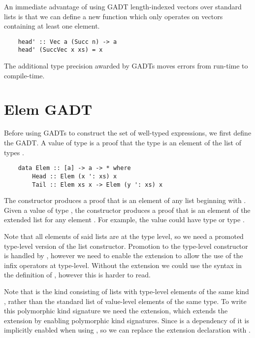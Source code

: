 An immediate advantage of using GADT length-indexed vectors over standard lists is that we can define a new function  which only operates on vectors containing at least one element. 

\begin{lstlisting}
    head' :: Vec a (Succ n) -> a
    head' (SuccVec x xs) = x
\end{lstlisting}

The additional type precision awarded by GADTs moves errors from run-time to compile-time.


\section{Elem GADT}

Before using GADTs to construct the set of well-typed expressions, we first define the  GADT. A value of type  is a proof that the type  is an element of the list of types . 

\begin{lstlisting}
    data Elem :: [a] -> a -> * where
        Head :: Elem (x ': xs) x
        Tail :: Elem xs x -> Elem (y ': xs) x
\end{lstlisting}
\cite{GADTs}

The  constructor produces a proof that  is an element of any list beginning with . Given a value of type , the  constructor produces a proof that  is an element of the extended list  for any element . For example, the value  could have type  or type . 

Note that all elements of said lists are at the type level, so we need a promoted type-level version of the \code{(:)} list constructor. Promotion to the type-level constructor  is handled by , however we need to enable the  extension to allow the use of the infix operators at type-level. Without the  extension we could use the syntax  in the definition of , however this is harder to read.

Note that \code{[a]} is the kind consisting of lists with type-level elements of the same kind , rather than the standard list of value-level elements of the same type. To write this polymorphic kind signature we need the  extension, which extends the  extension by enabling polymorphic kind signatures. Since  is a dependency of  it is implicitly enabled when using , so we can replace the  extension declaration with .

